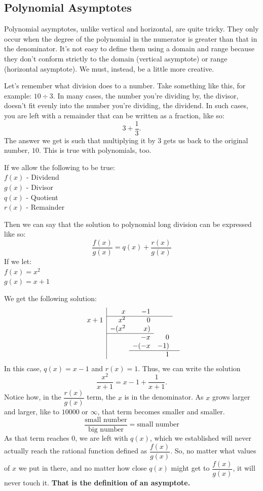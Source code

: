 \clearpage\subsection{Polynomial Asymptotes}
Polynomial asymptotes, unlike vertical and horizontal, are quite tricky. They only occur when the degree of the polynomial in the numerator is greater than that in the denominator. It's not easy to define them using a domain and range because they don't conform strictly to the domain (vertical asymptote) or range (horizontal asymptote). We must, instead, be a little more creative.

Let's remember what division does to a number. Take something like this, for example: $10 \div 3$. In many cases, the number you're dividing by, the divisor, doesn't fit evenly into the number you're dividing, the dividend. In such cases, you are left with a remainder that can be written as a fraction, like so:
\[
3 + \frac{1}{3} \text{.}
\]
The answer we get is such that multiplying it by $3$ gets us back to the original number, $10$. This is true with polynomials, too.

If we allow the following to be true: \\
$f(x)$ - Dividend\\
$g(x)$ - Divisor\\
$q(x)$ - Quotient\\
$r(x)$ - Remainder

Then we can say that the solution to polynomial long division can be expressed like so:
\[
\frac{f(x)}{g(x)} = q(x) + \frac{r(x)}{g(x)}
\]
\clearpage
If we let:\\
$f(x) = x^2$ \\
$g(x) = x + 1$

We get the following solution:
\[
\begin{array}{r|rrrrr}
& x & -1 & &\\ \cline{2-4}
x + 1 & x^2 & 0\\
& -(x^2 & x) & & \\ \cline{2-3}
& & -x & 0\\ 
& & -(-x & -1) \\ \cline{3-5}
& & & 1
\end{array}
\]
In this case, $q(x) = x - 1$ and $r(x) = 1$. Thus, we can write the solution
\[
\frac{x^2}{x + 1} = x - 1 + \frac{1}{x + 1} \text{.}
\]
Notice how, in the $\dfrac{r(x)}{g(x)}$ term, the $x$ is in the denominator. As $x$ grows larger and larger, like to $10000$ or $\infty$, that term becomes smaller and smaller.
\[
    \frac{\text{small number}}{\text{big number}} = \text{small number}
\]
As that term reaches $0$, we are left with $q(x)$, which we established will never actually reach the rational function defined as $\dfrac{f(x)}{g(x)}$. So, no matter what values of $x$ we put in there, and no matter how close $q(x)$ might get to $\dfrac{f(x)}{g(x)}$, it will never touch it. \textbf{That is the definition of an asymptote.}

